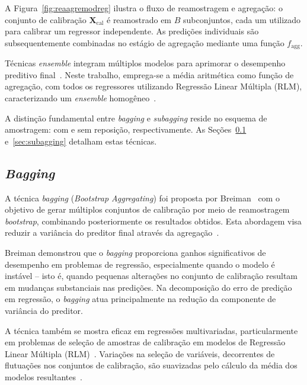 A Figura~\ref{fig:reaagremodreg} ilustra o fluxo de reamostragem e agregação: o conjunto de calibração $\mathbf{X}_{\mathrm{cal}}$ é reamostrado em $B$ subconjuntos, cada um utilizado para calibrar um regressor independente. As predições individuais são subsequentemente combinadas no estágio de agregação mediante uma função $f_{\text{agg}}$.

Técnicas \textit{ensemble} integram múltiplos modelos para aprimorar o desempenho preditivo final~\cite{Opitz1999}. Neste trabalho, emprega-se a média aritmética como função de agregação, com todos os regressores utilizando Regressão Linear Múltipla (RLM), caracterizando um \textit{ensemble} homogêneo~\cite{liu2025,iterative_mishra_2023,styawan2024}.

A distinção fundamental entre \textit{bagging} e \textit{subagging} reside no esquema de amostragem: com e sem reposição, respectivamente. As Seções~\ref{sec:bagging} e~\ref{sec:subagging} detalham estas técnicas.

\subsection{\textit{Bagging}}
\label{sec:bagging}

A técnica \textit{bagging} (\textit{Bootstrap Aggregating}) foi proposta por Breiman~\cite{Breiman1996} com o objetivo de gerar múltiplos conjuntos de calibração por meio de reamostragem \textit{bootstrap}, combinando posteriormente os resultados obtidos. Esta abordagem visa reduzir a variância do preditor final através da agregação~\cite{Breiman1996,Shabbir2024,HONG2020,nazhao2018,rathnayake2022}.

Breiman demonstrou que o \textit{bagging} proporciona ganhos significativos de desempenho em problemas de regressão, especialmente quando o modelo é instável -- isto é, quando pequenas alterações no conjunto de calibração resultam em mudanças substanciais nas predições. Na decomposição do erro de predição em regressão, o \textit{bagging} atua principalmente na redução da componente de variância do preditor.

A técnica também se mostra eficaz em regressões multivariadas, particularmente em problemas de seleção de amostras de calibração em modelos de Regressão Linear Múltipla (RLM)~\cite{kumari2024,HARDLE:2007}. Variações na seleção de variáveis, decorrentes de flutuações nos conjuntos de calibração, são suavizadas pelo cálculo da média dos modelos resultantes~\cite{MARTINS:2006}.

